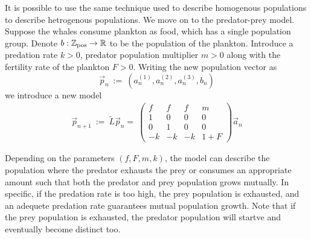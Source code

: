 \documentclass[11pt,reqno]{amsart}
\numberwithin{equation}{section}
\theoremstyle{plain}
\begin{document}
It is possible to use the same technique used to describe homogenous populations 
to describe hetrogenous populations. We move on to the predator-prey model. 
Suppose the whales consume plankton as food, which has a single population group. 
Denote $b:\mathbb Z_{\rm pos} \rightarrow \mathbb R$ to be the population of the plankton. 
Introduce a predation rate $k > 0$, predator population multiplier $m> 0$ 
along with the fertility rate of the plankton $F > 0$. Writing the 
new population vector as
\begin{equation}
    \vec p_n \ := \ (a^{(1)}_n, a^{(2)}_n, a^{(3)}_n, b_n)
\end{equation}
we introduce a new model 
\begin{eqnarray}\label{eqn:motivatingModel}
    \vec p_{n + 1} \ :=\ \widetilde L\vec p_n = \ 
    \begin{pmatrix}
        f & f & f & m\\ 
        1 & 0 & 0 & 0\\
        0 & 1 & 0 & 0 \\ 
        -k & -k & -k & 1 + F
    \end{pmatrix}\vec a_n
\end{eqnarray}

Depending on the parameters $(f, F, m, k)$, the model can 
describe the population where the predator exhausts the prey or 
consumes an appropriate amount such that both the predator and 
prey population grows mutually. In specific, if the predation 
rate is too high, the prey population is exhausted, and an adequete 
predation rate guarantees mutual population growth. Note that if 
the prey population is exhausted, the predator population will 
startve and eventually become distinct too. 
\end{document}
